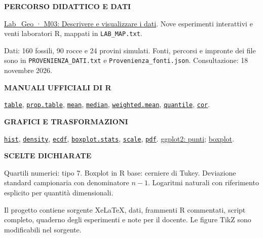\documentclass[12pt,aspectratio=1610]{beamer}
\newcommand{\PLabel}[1]{\par{\color{Classical}\bfseries\fontsize{9}{11}\selectfont\MakeUppercase{#1}}\par\vspace{1.8mm}}
\newcommand{\PBody}[1]{\par{\fontsize{11.3}{14.8}\selectfont #1\par}}
\newcommand{\PSmall}[1]{\par{\fontsize{9.8}{13.1}\selectfont #1\par}}
\newcommand{\PInfo}[1]{%
\begin{tcolorbox}[enhanced,arc=1.6mm,boxrule=.55pt,colback=GeoTint,
 colframe=Rule!80!Classical,left=2.3mm,right=2.3mm,top=2mm,bottom=2mm,
 before skip=1mm,after skip=1mm]
\PSmall{#1}\end{tcolorbox}}
\begin{document}
\begin{lrbox}{\FullWideBox}%
\begin{minipage}[t]{18.1cm}\raggedright\color{Ink}\fontsize{11.3}{14.8}\selectfont

\begin{minipage}[t]{8.7cm}
\PLabel{Percorso didattico e dati}
\PBody{\href{https://marzione00.github.io/Lab_Geo/\#modulo-M03}{Lab\_Geo · M03: Descrivere e visualizzare i dati}. Nove esperimenti interattivi e venti laboratori R, mappati in \texttt{LAB\_MAP.txt}.}
\vspace{2mm}
\PSmall{Dati: 160 fossili, 90 rocce e 24 provini simulati. Fonti, percorsi e impronte dei file sono in \texttt{PROVENIENZA\_DATI.txt} e \texttt{Provenienza\_fonti.json}. Consultazione: 18 novembre 2026.}
\vspace{3mm}
\PLabel{Manuali ufficiali di R}
\PSmall{\href{https://stat.ethz.ch/R-manual/R-devel/library/base/html/table.html}{\texttt{table}}, \href{https://stat.ethz.ch/R-manual/R-devel/library/base/html/proportions.html}{\texttt{prop.table}}, \href{https://stat.ethz.ch/R-manual/R-devel/library/base/html/mean.html}{\texttt{mean}}, \href{https://stat.ethz.ch/R-manual/R-devel/library/stats/html/median.html}{\texttt{median}}, \href{https://stat.ethz.ch/R-manual/R-devel/library/stats/html/weighted.mean.html}{\texttt{weighted.mean}}, \href{https://stat.ethz.ch/R-manual/R-devel/library/stats/html/quantile.html}{\texttt{quantile}}, \href{https://stat.ethz.ch/R-manual/R-devel/library/stats/html/cor.html}{\texttt{cor}}.}
\end{minipage}\hfill
\begin{minipage}[t]{8.7cm}
\PLabel{Grafici e trasformazioni}
\PSmall{\href{https://stat.ethz.ch/R-manual/R-devel/library/graphics/html/hist.html}{\texttt{hist}}, \href{https://stat.ethz.ch/R-manual/R-devel/library/stats/html/density.html}{\texttt{density}}, \href{https://stat.ethz.ch/R-manual/R-devel/library/stats/html/ecdf.html}{\texttt{ecdf}}, \href{https://stat.ethz.ch/R-manual/R-devel/library/grDevices/html/boxplot.stats.html}{\texttt{boxplot.stats}}, \href{https://stat.ethz.ch/R-manual/R-devel/library/base/html/scale.html}{\texttt{scale}}, \href{https://stat.ethz.ch/R-manual/R-devel/library/grDevices/html/pdf.html}{\texttt{pdf}}. \href{https://ggplot2.tidyverse.org/reference/geom_point.html}{ggplot2: punti}; \href{https://ggplot2.tidyverse.org/reference/geom_boxplot.html}{boxplot}.}
\vspace{3mm}
\PLabel{Scelte dichiarate}
\PBody{Quartili numerici: tipo 7. Boxplot in R base: cerniere di Tukey. Deviazione standard campionaria con denominatore $n-1$. Logaritmi naturali con riferimento esplicito per quantità dimensionali.}
\vspace{2mm}
\PInfo{Il progetto contiene sorgente XeLaTeX, dati, frammenti R commentati, script completo, quaderno degli esperimenti e note per il docente. Le figure TikZ sono modificabili nel sorgente.}
\end{minipage}

\end{minipage}%
\end{lrbox}
\end{document}
